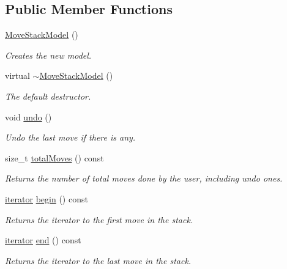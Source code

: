 \subsection*{Public Member Functions}
\begin{DoxyCompactItemize}
\item 
\mbox{\hyperlink{class_move_stack_model_aaed956e471dc01eb1c996001e2d3751b}{Move\+Stack\+Model}} ()
\begin{DoxyCompactList}\small\item\em Creates the new model. \end{DoxyCompactList}\item 
\mbox{\label{class_move_stack_model_a3b1aec2985059d170399ae0ce971cbcd}} 
virtual \mbox{\hyperlink{class_move_stack_model_a3b1aec2985059d170399ae0ce971cbcd}{$\sim$\+Move\+Stack\+Model}} ()
\begin{DoxyCompactList}\small\item\em The default destructor. \end{DoxyCompactList}\item 
void \mbox{\hyperlink{class_move_stack_model_a10ab990b00c1eb0d543d75b8b07eb4bf}{undo}} ()
\begin{DoxyCompactList}\small\item\em Undo the last move if there is any. \end{DoxyCompactList}\item 
size\+\_\+t \mbox{\hyperlink{class_move_stack_model_a59f08def53913e4f33df7fe30a16dc75}{total\+Moves}} () const
\begin{DoxyCompactList}\small\item\em Returns the number of total moves done by the user, including {\ttfamily undo} ones. \end{DoxyCompactList}\item 
\mbox{\hyperlink{class_move_stack_model_a64b3cd5b744e18ce4cebd87957b2f3fa}{iterator}} \mbox{\hyperlink{class_move_stack_model_a5617b792b9e541940f6bfdbcc3c08bfa}{begin}} () const
\begin{DoxyCompactList}\small\item\em Returns the iterator to the first move in the stack. \end{DoxyCompactList}\item 
\mbox{\hyperlink{class_move_stack_model_a64b3cd5b744e18ce4cebd87957b2f3fa}{iterator}} \mbox{\hyperlink{class_move_stack_model_aa4d30bfd992058342c0faff6ab5492b9}{end}} () const
\begin{DoxyCompactList}\small\item\em Returns the iterator to the last move in the stack. \end{DoxyCompactList}\end{DoxyCompactItemize}


